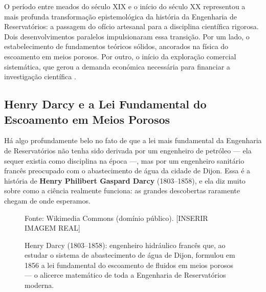 \documentclass[
  12pt,
  a4paper,
  oneside,
  brazilian,
  sumario=tradicional
]{abntex2}
\renewcommand{\fonte}[1]{\vspace{2pt}\par\noindent\footnotesize Fonte: #1}
\begin{document}
O período entre meados do século XIX e o início do século XX
representou a mais profunda transformação epistemológica da história
da Engenharia de Reservatórios: a passagem do ofício artesanal para a
disciplina científica rigorosa. Dois desenvolvimentos paralelos
impulsionaram essa transição. Por um lado, o estabelecimento de
fundamentos teóricos sólidos, ancorados na física do escoamento em
meios porosos. Por outro, o início da exploração comercial sistemática,
que gerou a demanda económica necessária para financiar a investigação
científica \cite{dake2014, rosa2006}.

\subsection{Henry Darcy e a Lei Fundamental do Escoamento em Meios Porosos}

Há algo profundamente belo no fato de que a lei mais fundamental da
Engenharia de Reservatórios não tenha sido derivada por um engenheiro
de petróleo — ela sequer existia como disciplina na época —, mas por
um engenheiro sanitário francês preocupado com o abastecimento de água
da cidade de Dijon. Essa é a história de \textbf{Henry Philibert
Gaspard Darcy} (1803--1858), e ela diz muito sobre como a ciência
realmente funciona: as grandes descobertas raramente chegam de onde
esperamos.

\begin{figure}[H]
  \centering
  \caption{Henry Darcy (1803--1858): engenheiro hidráulico francês que, ao estudar o sistema de abastecimento de água de Dijon, formulou em 1856 a lei fundamental do escoamento de fluidos em meios porosos — o alicerce matemático de toda a Engenharia de Reservatórios moderna.}
  \label{fig:darcy_retrato}
  \fonte{Wikimedia Commons (domínio público). [INSERIR IMAGEM REAL]}
\end{figure}
\end{document}
